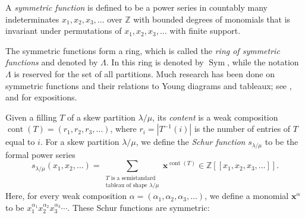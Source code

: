 \documentclass[12pt]{article}
\theoremstyle{plain}
\theoremstyle{definition}
\newenvironment{todo}{}{}
\let\sumnonlimits\sum
\renewcommand{\sum}{\sumnonlimits\limits}
\def\x{{\mathbf{x}}}
\def\lm{{\lambda/\mu}}
\def\Z{{\mathbb{Z}}}
\begin{document}
\begin{comment}
The \textit{symmetric functions} over $\mathbf{k}$ are defined to be the
symmetric bounded-degree power series $f\in\mathbf{k}\left[  \left[
x_{1},x_{2},x_{3},\ldots\right]  \right]  $. They form a $\mathbf{k}%
$-subalgebra of $\mathbf{k}\left[  \left[  x_{1},x_{2},x_{3},\ldots\right]
\right]  $. This $\mathbf{k}$-subalgebra is called the \textit{ring of
symmetric functions over }$\mathbf{k}$; it will be denoted by $\Lambda$ or
(when $\mathbf{k}$ is not clear from the context) by $\Lambda_{\mathbf{k}}$.
(The reader shall be warned that \cite{LamPyl} denotes this $\mathbf{k}%
$-algebra by $\operatorname*{Sym}$, while using the notation $\Lambda$ for the
set of all partitions.) Symmetric functions are a classical
field of research, and are closely related to Young diagrams and tableaux; see
\cite[Chapter 7]{Stan99}, \cite{Macdon95} and \cite[Chapter 2]{GriRei15} for expositions.

\begin{todo}
 Decide whether we want to work over $\Z$ or over an arbitrary commutative field $\mathbf{k}$ with unity. 
\end{todo}
\end{comment}


A \textit{symmetric function} is defined to be a
power series in countably many indeterminates $x_1,x_2,x_3,\dots$ over $\Z$ with bounded degrees of monomials that is invariant under permutations of $x_1,x_2,x_3,\dots$ with finite support. 

The symmetric functions form a ring, which is called the \textit{ring of
symmetric functions} and denoted by $\Lambda$. In \cite{LamPyl} this ring is denoted by $\operatorname*{Sym}$, while the notation $\Lambda$ is reserved for the
set of all partitions. Much research has been done on symmetric functions and
their relations to Young diagrams and tableaux; see
\cite[Chapter 7]{Stan99}, \cite{Macdon95} and \cite[Chapter 2]{GriRei15} for expositions. 




 Given a filling $T$ of a skew partition $\lm$, its \textit{content} is a weak composition $\operatorname*{cont}\left(  T\right)=\left(r_1,r_2,r_3,\dots\right)$, where $r_i=\left|T^{-1}(i)\right|$ is the number of entries of $T$ equal to $i$. For a skew partition $\lambda/\mu$, we define the \textit{Schur function}
$s_{\lambda/\mu}$ to be the formal power series 
\[
s_\lm(x_1,x_2,\dots)
= \sum_{\substack{T\text{ is a semistandard}\\\text{tableau of shape } \lm}}
\mathbf{x}^{\operatorname*{cont}\left(  T\right)  }
\in \Z\left[\left[x_1,x_2,x_3,\ldots\right]\right] .
\]
Here, for every weak composition $\alpha = \left(\alpha_1, \alpha_2, \alpha_3, \ldots\right)$, we define a monomial $\x^\alpha$ to be $x_1^{\alpha_1} x_2^{\alpha_2} x_3^{\alpha_3} \cdots$.
These Schur functions are symmetric:
\end{document}
